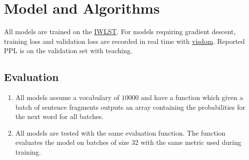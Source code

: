 \documentclass[11pt]{article}
\begin{document}
%
%
%
%
%
%

\section{Model and Algorithms}

All models are trained on the \href{http://workshop2017.iwslt.org/}{IWLST}. For models requiring gradient descent, training loss and validation loss are recorded in real time with \href{https://github.com/facebookresearch/visdom}{visdom}. Reported PPL is on the validation set with teaching.

\subsection{Evaluation}
\begin{enumerate}
\item All models assume a vocabulary of $10000$ and have a  function which given a batch of sentence fragments outputs an array containing the probabilities for the next word for all batches.

\item All models are tested with the same evaluation function. The function evaluates the model on batches of size 32 with the same metric used during training.
\end{enumerate}
\end{document}

